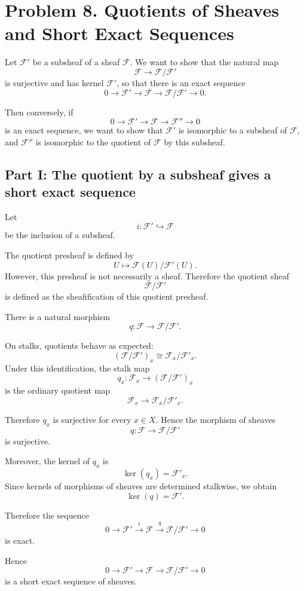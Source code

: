 \documentclass[12pt,a4paper]{article}
\newcommand{\F}{\mathcal F}
\theoremstyle{notespace}
\newcommand{\Fp}{\mathcal F'}      %
\newcommand{\Fpp}{\mathcal F''}
\begin{document}
\section{Problem 8. Quotients of Sheaves and Short Exact Sequences}

Let \(\Fp\) be a subsheaf of a sheaf \(\F\). We want to show that the natural map
\[
\F\longrightarrow \F/\Fp
\]
is surjective and has kernel \(\Fp\), so that there is an exact sequence
\[
0\longrightarrow \Fp \longrightarrow \F \longrightarrow \F/\Fp \longrightarrow 0.
\]

Then conversely, if
\[
0\longrightarrow \Fp \longrightarrow \F \longrightarrow \Fpp \longrightarrow 0
\]
is an exact sequence, we want to show that \(\Fp\) is isomorphic to a subsheaf of \(\F\), and \(\Fpp\) is isomorphic to the quotient of \(\F\) by this subsheaf.

\subsection{Part I: The quotient by a subsheaf gives a short exact sequence}

Let
\[
i:\Fp\hookrightarrow \F
\]
be the inclusion of a subsheaf.

The quotient presheaf is defined by
\[
U\longmapsto \F(U)/\Fp(U).
\]
However, this presheaf is not necessarily a sheaf. Therefore the quotient sheaf
\[
\F/\Fp
\]
is defined as the sheafification of this quotient presheaf.

There is a natural morphism
\[
q:\F\longrightarrow \F/\Fp.
\]

On stalks, quotients behave as expected:
\[
(\F/\Fp)_x \cong \F_x/\Fp_x.
\]
Under this identification, the stalk map
\[
q_x:\F_x\longrightarrow (\F/\Fp)_x
\]
is the ordinary quotient map
\[
\F_x\longrightarrow \F_x/\Fp_x.
\]

Therefore \(q_x\) is surjective for every \(x\in X\). Hence the morphism of sheaves
\[
q:\F\longrightarrow \F/\Fp
\]
is surjective.

Moreover, the kernel of \(q_x\) is
\[
\ker(q_x)=\Fp_x.
\]
Since kernels of morphisms of sheaves are determined stalkwise, we obtain
\[
\ker(q)=\Fp.
\]

Therefore the sequence
\[
0\longrightarrow \Fp
\xrightarrow{i}
\F
\xrightarrow{q}
\F/\Fp
\longrightarrow 0
\]
is exact.

Hence
\[
\boxed{
	0\longrightarrow \Fp
	\longrightarrow \F
	\longrightarrow \F/\Fp
	\longrightarrow 0
}
\]
is a short exact sequence of sheaves.
\end{document}
